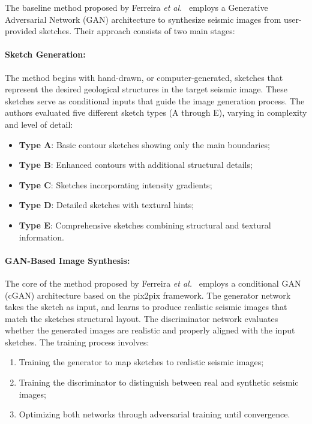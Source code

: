 \documentclass{ieeeaccess}
\begin{document}
The baseline method proposed by Ferreira \emph{et al.}~\cite{Ferreira2020} employs a Generative Adversarial Network (GAN) architecture to synthesize seismic images from user-provided sketches. Their approach consists of two main stages:

\paragraph{Sketch Generation:} The method begins with hand-drawn, or computer-generated, sketches that represent the desired geological structures in the target seismic image. These sketches serve as conditional inputs that guide the image generation process. The authors evaluated five different sketch types (A through E), varying in complexity and level of detail:

\begin{itemize}
    \item \textbf{Type A}: Basic contour sketches showing only the main boundaries;
    \item \textbf{Type B}: Enhanced contours with additional structural details;
    \item \textbf{Type C}: Sketches incorporating intensity gradients;
    \item \textbf{Type D}: Detailed sketches with textural hints;
    \item \textbf{Type E}: Comprehensive sketches combining structural and textural information.
\end{itemize}

\paragraph{GAN-Based Image Synthesis:} The core of the method proposed by Ferreira \emph{et al.}~\cite{Ferreira2020} employs a conditional GAN (cGAN) architecture based on the pix2pix framework. The generator network takes the sketch as input, and learns to produce realistic seismic images that match the sketches structural layout. The discriminator network evaluates whether the generated images are realistic and properly aligned with the input sketches. The training process involves:
\begin{enumerate}
    \item Training the generator to map sketches to realistic seismic images;
    \item Training the discriminator to distinguish between real and synthetic seismic images;
    \item Optimizing both networks through adversarial training until convergence.
\end{enumerate}
\end{document}
